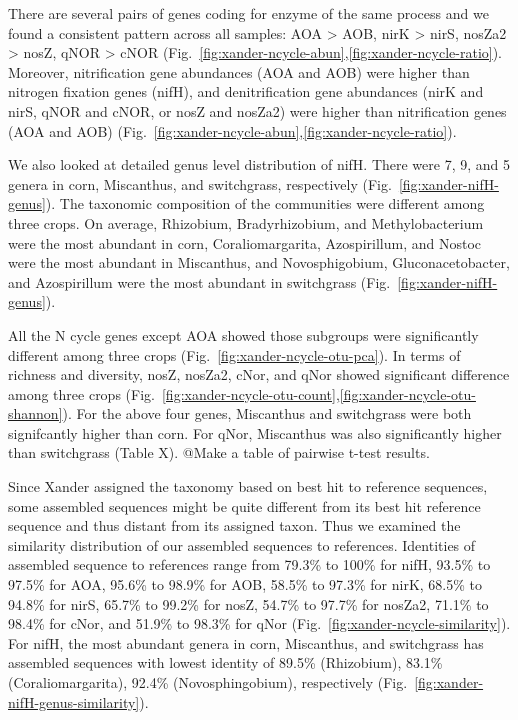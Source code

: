 \documentclass[12pt]{article}
\begin{document}
There are several pairs of genes coding for enzyme of the same process and we found a consistent pattern across all samples: AOA {\textgreater} AOB, nirK {\textgreater} nirS, nosZa2 {\textgreater} nosZ, qNOR {\textgreater} cNOR (Fig.~\ref{fig:xander-ncycle-abun},\ref{fig:xander-ncycle-ratio}). Moreover, nitrification gene abundances (AOA and AOB) were higher than nitrogen fixation genes (nifH), and denitrification gene abundances (nirK and nirS, qNOR and cNOR, or nosZ and nosZa2) were higher than nitrification genes (AOA and AOB) (Fig.~\ref{fig:xander-ncycle-abun},\ref{fig:xander-ncycle-ratio}).

We also looked at detailed genus level distribution of nifH. There were 7, 9, and 5 genera in corn, Miscanthus, and switchgrass, respectively (Fig.~\ref{fig:xander-nifH-genus}). The taxonomic composition of the communities were different among three crops. On average, Rhizobium, Bradyrhizobium, and Methylobacterium were the most abundant in corn, Coraliomargarita, Azospirillum, and Nostoc were the most abundant in Miscanthus, and Novosphigobium, Gluconacetobacter, and Azospirillum were the most abundant in switchgrass (Fig.~\ref{fig:xander-nifH-genus}).



All the N cycle genes except AOA showed those subgroups were significantly different among three crops (Fig.~\ref{fig:xander-ncycle-otu-pca}). In terms of richness and diversity, nosZ, nosZa2, cNor, and qNor showed significant difference among three crops (Fig.~\ref{fig:xander-ncycle-otu-count},\ref{fig:xander-ncycle-otu-shannon}). For the above four genes, Miscanthus and switchgrass were both signifcantly higher than corn. For qNor, Miscanthus was also significantly higher than switchgrass (Table X). @Make a table of pairwise t-test results.

Since Xander assigned the taxonomy based on best hit to reference sequences, some assembled sequences might be quite different from its best hit reference sequence and thus distant from its assigned taxon. Thus we examined the similarity distribution of our assembled sequences to references. Identities of assembled sequence to references range from 79.3\% to 100\% for nifH, 93.5\% to 97.5\% for AOA, 95.6\% to 98.9\% for AOB, 58.5\% to 97.3\% for nirK, 68.5\% to 94.8\% for nirS, 65.7\% to 99.2\% for nosZ, 54.7\% to 97.7\% for nosZa2, 71.1\% to 98.4\% for cNor, and 51.9\% to 98.3\% for qNor (Fig.~\ref{fig:xander-ncycle-similarity}). For nifH, the most abundant genera in corn, Miscanthus, and switchgrass has assembled sequences with lowest identity of 89.5\% (Rhizobium), 83.1\% (Coraliomargarita), 92.4\% (Novosphingobium), respectively (Fig.~\ref{fig:xander-nifH-genus-similarity}).
\end{document}
